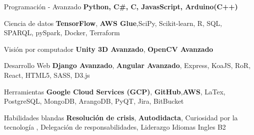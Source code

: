

\begin{cvskills}

  \cvskill
    {Programación - Avanzado} %
    {\textbf{Python, C\#, C, JavasScript, Arduino(C++)}} %

  \cvskill
    {Ciencia de datos}
    {\textbf{TensorFlow}, \textbf{AWS Glue},SciPy, Scikit-learn, R, SQL, SPARQL, pySpark, Docker, Terraform}

  \cvskill
    {Visión por computador} %
    {\textbf{Unity 3D Avanzado}, \textbf{OpenCV Avanzado}} %

  \cvskill
    {Desarrollo Web} %
    {\textbf{Django Avanzado}, \textbf{Angular Avanzado}, Express, KoaJS, RoR, React, HTML5, SASS, D3.js} %

  \cvskill
    {Herramientas}
    {\textbf{Google Cloud Services (GCP)}, \textbf{GitHub},\textbf{AWS}, LaTex, PostgreSQL, MongoDB, ArangoDB, PyQT, Jira, BitBucket}

  \cvskill
    {Habilidades blandas}
    {\textbf{Resolución de crisis}, \textbf{Autodidacta}, Curiosidad por la tecnología , Delegación de responsabilidades, Liderazgo}
  \cvskill
    {Idiomas} %
    {Ingles B2} %

\end{cvskills}
